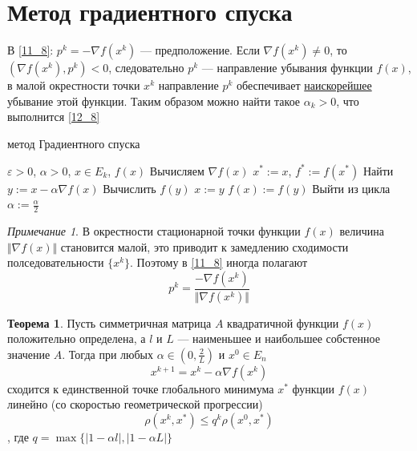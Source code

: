 \documentclass[oneside]{book}
\theoremstyle{plain}
\theoremstyle{remark}
\newtheorem*{remark}{Примечание}
\theoremstyle{definition}
\newtheorem{theorem}{Теорема}[section]
\newenvironment{rualgo}[1][]
  {\begin{algorithm}[#1]
     \selectlanguage{russian}%
     \floatname{algorithm}{Алгоритм}%
     \renewcommand{\algorithmicif}{{\color{red}\textbf{если}}}%
     \renewcommand{\algorithmicthen}{{\color{red}\textbf{тогда}}}%
     \renewcommand{\algorithmicelse}{{\color{red}\textbf{иначе}}}%
     \renewcommand{\algorithmicend}{{\color{red}\textbf{конец}}}%
     \renewcommand{\algorithmicfor}{{\color{red}\textbf{для}}}%
     \renewcommand{\algorithmicto}{{\color{red}\textbf{до}}}%
     \renewcommand{\algorithmicdo}{{\color{red}\textbf{делать}}}%
     \renewcommand{\algorithmicwhile}{{\color{red}\textbf{пока}}}%
     \renewcommand{\algorithmicrepeat}{{\color{red}\textbf{повторять}}}%
     \renewcommand{\algorithmicuntil}{{\color{red}\textbf{до тех пор пока}}}%
     \renewcommand{\algorithmicloop}{{\color{red}\textbf{повторять}}}%
     \renewcommand{\algorithmicnot}{{\color{blue}\textbf{не}}}%
     \renewcommand{\algorithmicand}{{\color{blue}\textbf{и}}}%
     \renewcommand{\algorithmicor}{{\color{blue}\textbf{или}}}%
     \renewcommand{\algorithmicrequire}{{\color{blue}\textbf{Ввод}}}%
     \renewcommand{\algorithmicrensure}{{\color{blue}\textbf{Вывод}}}%
     \renewcommand{\algorithmicreturn}{{\color{red}\textbf{Вернуть}}}%
     \renewcommand{\algorithmicrtrue}{{\color{blue}\textbf{истинна}}}%
     \renewcommand{\algorithmicrfalse}{{\color{blue}\textbf{ложь}}}%
  }
  {\end{algorithm}}
\begin{document}
\section{Метод градиентного спуска}
\label{sec:org78060a9}
В \ref{11_8}: \(p^k = - \nabla f(x^k)\) --- предположение. Если \(\nabla f(x^k) \neq 0\), то \((\nabla f(x^k), p^k) < 0\), следовательно \(p^k\) --- направление убывания функции \(f(x)\), в малой окрестности точки \(x^k\) направление \(p^k\) обеспечивает \uline{наискорейшее} убывание этой функции. Таким образом можно найти такое \(\alpha_k > 0\), что выполнится \ref{12_8}
\begin{rualgo}[H]
\caption{метод Градиентного спуска}
\begin{algorithmic}[1]
\REQUIRE \(\varepsilon > 0\), \(\alpha > 0\), \(x \in E_k\), \(f(x)\)
\LOOP
  \STATE Вычисляем \(\nabla f(x)\)
    \RETURN \(x^* := x\), \(f^* := f(x^*)\)
  \ENDIF
  \LOOP
    \STATE Найти \(y := x - \alpha \nabla f(x)\)
    \STATE Вычислить \(f(y)\)
      \STATE \(x := y\)
      \STATE \(f(x) := f(y)\)
      \STATE Выйти из цикла
    \ELSE
      \STATE \(\alpha := \frac{\alpha}{2}\)
    \ENDIF
  \ENDLOOP
\ENDLOOP
\end{algorithmic}
\end{rualgo}
\begin{remark}
В окрестности стационарной точки функции \(f(x)\) величина \(\Vert \nabla f(x) \Vert\) становится малой, это приводит к замедлению сходимости полседовательности \(\{x^k\}\). Поэтому в \ref{11_8} иногда полагают
\[ p^k = \frac{-\nabla f(x^k)}{\Vert \nabla f(x^k) \Vert} \]
\end{remark}
\begin{theorem}
Пусть симметричная матрица \(A\) квадратичной функции \(f(x)\) положительно определена, а \(l\) и \(L\) --- наименьшее и наибольшее собстенное значение \(A\). Тогда при любых \(\alpha \in (0, \frac{2}{L})\) и \(x^0 \in E_n\)
\[ x^{k + 1} = x^k - \alpha \nabla f(x^k) \]
сходится к единственной точке глобального минимума \(x^*\) функции \(f(x)\) линейно (со скоростью геометрической прогрессии)
\[ \rho(x^k, x^*) \le q^k \rho(x^0, x^*) \]
, где \(q = \max \{| 1 - \alpha l|, |1 - \alpha L|\}\)
\end{theorem}
\end{document}
